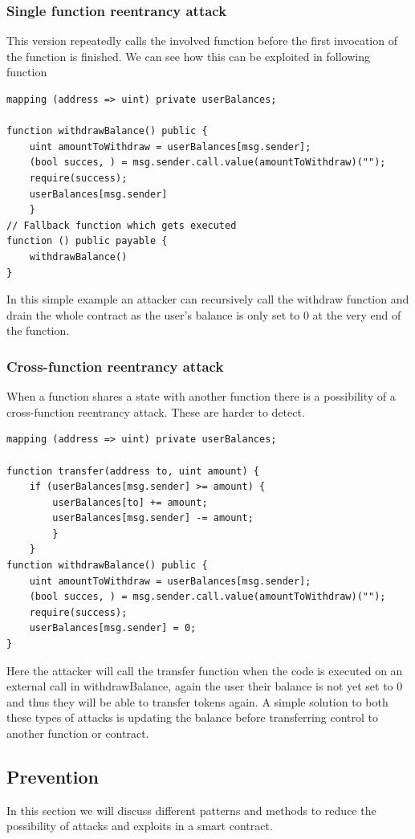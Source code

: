 \documentclass[sigconf]{acmart}
\begin{document}
\subsubsection{Single function reentrancy attack}
This version repeatedly calls the involved function before the first invocation of the function is finished. We can see how this can be exploited in following function
\begin{lstlisting}[language=Solidity, caption=Single function reentrancy attack]
mapping (address => uint) private userBalances;

function withdrawBalance() public {
    uint amountToWithdraw = userBalances[msg.sender];
    (bool succes, ) = msg.sender.call.value(amountToWithdraw)("");
    require(success);
    userBalances[msg.sender]
    }
// Fallback function which gets executed
function () public payable {
    withdrawBalance()
}
\end{lstlisting}
In this simple example an attacker can recursively call the withdraw function and drain the whole contract as the user's balance is only set to 0 at the very end of the function.
\subsubsection{Cross-function reentrancy attack}
When a function shares a state with another function there is a possibility of a cross-function reentrancy attack. These are harder to detect. 
\begin{lstlisting}[language=Solidity, caption=Cross-function reentrancy attack]
mapping (address => uint) private userBalances;

function transfer(address to, uint amount) {
    if (userBalances[msg.sender] >= amount) {
        userBalances[to] += amount;
        userBalances[msg.sender] -= amount;
        }
    }
function withdrawBalance() public {
    uint amountToWithdraw = userBalances[msg.sender];
    (bool succes, ) = msg.sender.call.value(amountToWithdraw)("");
    require(success);
    userBalances[msg.sender] = 0;
}

\end{lstlisting}
Here the attacker will call the transfer function when the code is executed on an external call in withdrawBalance, again the user their balance is not yet set to 0 and thus they will be able to transfer tokens again. A simple solution to both these types of attacks is updating the balance before transferring control to another function or contract.
\subsection{Prevention}
In this section we will discuss different patterns and methods to reduce the possibility of attacks and exploits in a smart contract. 
\end{document}
